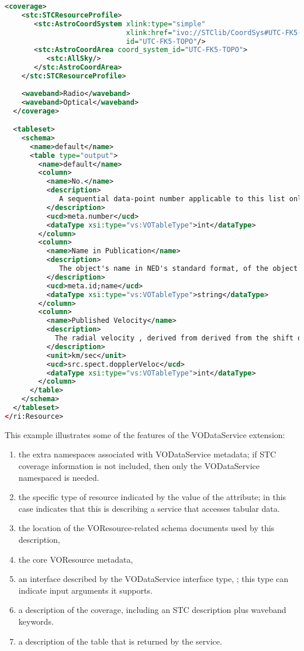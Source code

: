 \documentclass[11pt,a4paper]{ivoa}
\begin{document}
\begin{lstlisting}[language=XML]
  <coverage>
    <stc:STCResourceProfile>
       <stc:AstroCoordSystem xlink:type="simple"
                             xlink:href="ivo://STClib/CoordSys#UTC-FK5-TOPO" 
                             id="UTC-FK5-TOPO"/> 
       <stc:AstroCoordArea coord_system_id="UTC-FK5-TOPO">
          <stc:AllSky/>
       </stc:AstroCoordArea>
    </stc:STCResourceProfile>
    
    <waveband>Radio</waveband>
    <waveband>Optical</waveband>
  </coverage>

  <tableset>
    <schema>
      <name>default</name>
      <table type="output">
        <name>default</name>
        <column>
          <name>No.</name>
          <description>
             A sequential data-point number applicable to this list only.
          </description>
          <ucd>meta.number</ucd>
          <dataType xsi:type="vs:VOTableType">int</dataType>
        </column>
        <column>
          <name>Name in Publication</name>
          <description>
             The object's name in NED's standard format, of the object to which the data apply.
          </description>
          <ucd>meta.id;name</ucd>
          <dataType xsi:type="vs:VOTableType">string</dataType>
        </column>
        <column>
          <name>Published Velocity</name>
          <description>
            The radial velocity , derived from derived from the shift of some spectral feature, in km/sec
          </description>
          <unit>km/sec</unit>
          <ucd>src.spect.dopplerVeloc</ucd>
          <dataType xsi:type="vs:VOTableType">int</dataType>
        </column>
      </table>
    </schema>
  </tableset>
</ri:Resource>
\end{lstlisting}

This example illustrates some of the features of the VODataService
extension:

\begin{enumerate}
\item the extra namespaces associated with
       VODataService metadata; if STC coverage information
        is not
       included, then only the VODataService namespaced is needed.
\item the specific type of resource indicated by
       the value of the  attribute; in this case
        indicates that this is
       describing a service that accesses tabular data.
\item the location of the VOResource-related schema 
       documents used by this description,
\item the core VOResource metadata,
\item an interface described by the
       VODataService interface type, ; this
       type can indicate input arguments it supports.
\item a description of the
       coverage, including an STC
       description plus waveband keywords.
\item a description of the table that is returned
       by the service.
\end{enumerate}
\end{document}
